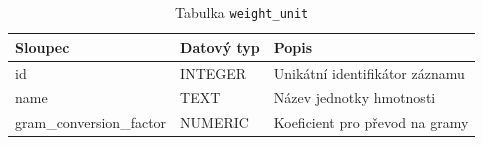 \begin{table}[ht!]
    \centering
    \begin{tabularx}{\textwidth}{|l|l|L|}
        \hline
        \textbf{Sloupec}         & \textbf{Datový typ} & \textbf{Popis}                 \\ \hline
        id                       & INTEGER             & Unikátní identifikátor záznamu \\ \hline
        name                     & TEXT                & Název jednotky hmotnosti       \\ \hline
        gram\_conversion\_factor & NUMERIC             & Koeficient pro převod na gramy \\ \hline
    \end{tabularx}
    \caption{Tabulka \texttt{weight\_unit}}
    \label{tab:weight_unit}
\end{table}
